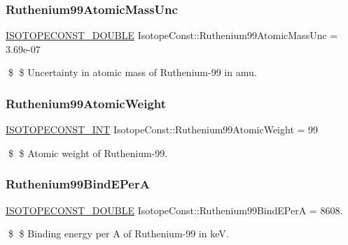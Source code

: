 \subsubsection{\texorpdfstring{Ruthenium99\+Atomic\+Mass\+Unc}{Ruthenium99AtomicMassUnc}}
{\footnotesize\ttfamily \mbox{\hyperlink{group___isotope_const-_macros_ga8f45a7272ce02c0b4c65c44636ed719a}{I\+S\+O\+T\+O\+P\+E\+C\+O\+N\+S\+T\+\_\+\+D\+O\+U\+B\+LE}} Isotope\+Const\+::\+Ruthenium99\+Atomic\+Mass\+Unc = 3.\+69e-\/07}

\$ \$ Uncertainty in atomic mass of Ruthenium-\/99 in amu. \mbox{\label{group___isotope_const-_ruthenium-_ru99_gaa92b6efa109be40cd9becfa7c058f8d4}} 
\subsubsection{\texorpdfstring{Ruthenium99\+Atomic\+Weight}{Ruthenium99AtomicWeight}}
{\footnotesize\ttfamily \mbox{\hyperlink{group___isotope_const-_macros_ga5f18360b3e99483a35c32d789e62621c}{I\+S\+O\+T\+O\+P\+E\+C\+O\+N\+S\+T\+\_\+\+I\+NT}} Isotope\+Const\+::\+Ruthenium99\+Atomic\+Weight = 99}

\$ \$ Atomic weight of Ruthenium-\/99. \mbox{\label{group___isotope_const-_ruthenium-_ru99_ga87e1e3b97d72a29ffa3fcc1caa2116da}} 
\subsubsection{\texorpdfstring{Ruthenium99\+Bind\+E\+PerA}{Ruthenium99BindEPerA}}
{\footnotesize\ttfamily \mbox{\hyperlink{group___isotope_const-_macros_ga8f45a7272ce02c0b4c65c44636ed719a}{I\+S\+O\+T\+O\+P\+E\+C\+O\+N\+S\+T\+\_\+\+D\+O\+U\+B\+LE}} Isotope\+Const\+::\+Ruthenium99\+Bind\+E\+PerA = 8608.}

\$ \$ Binding energy per A of Ruthenium-\/99 in keV. \mbox{\label{group___isotope_const-_ruthenium-_ru99_gaaff5f9a6a1315edb5d6be9127b87d78a}} 
